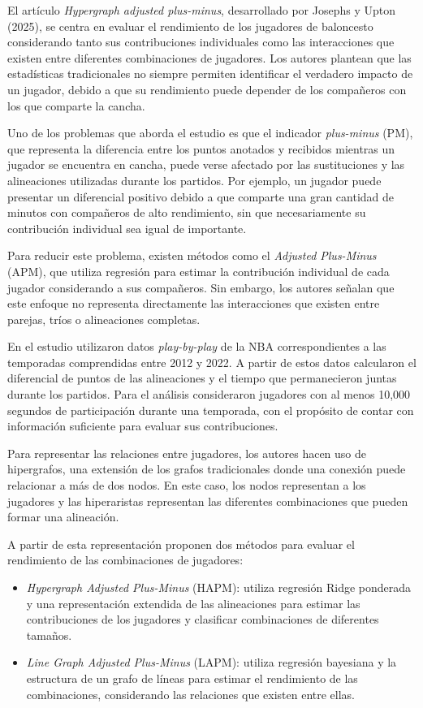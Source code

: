 El artículo \textit{Hypergraph adjusted plus-minus}, desarrollado por Josephs y Upton (2025), se centra en evaluar el rendimiento de los jugadores de baloncesto considerando tanto sus contribuciones individuales como las interacciones que existen entre diferentes combinaciones de jugadores. Los autores plantean que las estadísticas tradicionales no siempre permiten identificar el verdadero impacto de un jugador, debido a que su rendimiento puede depender de los compañeros con los que comparte la cancha.

Uno de los problemas que aborda el estudio es que el indicador \textit{plus-minus} (PM), que representa la diferencia entre los puntos anotados y recibidos mientras un jugador se encuentra en cancha, puede verse afectado por las sustituciones y las alineaciones utilizadas durante los partidos. Por ejemplo, un jugador puede presentar un diferencial positivo debido a que comparte una gran cantidad de minutos con compañeros de alto rendimiento, sin que necesariamente su contribución individual sea igual de importante.

Para reducir este problema, existen métodos como el \textit{Adjusted Plus-Minus} (APM), que utiliza regresión para estimar la contribución individual de cada jugador considerando a sus compañeros. Sin embargo, los autores señalan que este enfoque no representa directamente las interacciones que existen entre parejas, tríos o alineaciones completas.

En el estudio utilizaron datos \textit{play-by-play} de la NBA correspondientes a las temporadas comprendidas entre 2012 y 2022. A partir de estos datos calcularon el diferencial de puntos de las alineaciones y el tiempo que permanecieron juntas durante los partidos. Para el análisis consideraron jugadores con al menos 10,000 segundos de participación durante una temporada, con el propósito de contar con información suficiente para evaluar sus contribuciones.

Para representar las relaciones entre jugadores, los autores hacen uso de hipergrafos, una extensión de los grafos tradicionales donde una conexión puede relacionar a más de dos nodos. En este caso, los nodos representan a los jugadores y las hiperaristas representan las diferentes combinaciones que pueden formar una alineación.

A partir de esta representación proponen dos métodos para evaluar el rendimiento de las combinaciones de jugadores:

\begin{itemize}
    \item \textit{Hypergraph Adjusted Plus-Minus} (HAPM): utiliza regresión Ridge ponderada y una representación extendida de las alineaciones para estimar las contribuciones de los jugadores y clasificar combinaciones de diferentes tamaños.

    \item \textit{Line Graph Adjusted Plus-Minus} (LAPM): utiliza regresión bayesiana y la estructura de un grafo de líneas para estimar el rendimiento de las combinaciones, considerando las relaciones que existen entre ellas.
\end{itemize}

